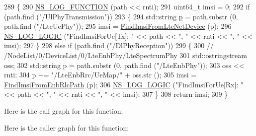 \begin{DoxyCode}
289 \{
290   \hyperlink{log-macros-disabled_8h_a90b90d5bad1f39cb1b64923ea94c0761}{NS\_LOG\_FUNCTION} (path << rnti);
291   uint64\_t imsi = 0;
292   \textcolor{keywordflow}{if} (path.find (\textcolor{stringliteral}{"/UlPhyTransmission"}))
293     \{
294       std::string \hyperlink{lte__link__budget_8m_ac9de518908a968428863f829398a4e62}{p} = path.substr (0, path.find (\textcolor{stringliteral}{"/LteUePhy"}));
295       imsi = \hyperlink{classns3_1_1LteStatsCalculator_a85843b5cea26f922818c1e3374a08e18}{FindImsiFromLteNetDevice} (p);
296       \hyperlink{group__logging_ga88acd260151caf2db9c0fc84997f45ce}{NS\_LOG\_LOGIC} (\textcolor{stringliteral}{"FindImsiForUe[Tx]: "} << path << \textcolor{stringliteral}{", "} << rnti << \textcolor{stringliteral}{", "} << imsi);
297     \}
298   \textcolor{keywordflow}{else} \textcolor{keywordflow}{if} (path.find (\textcolor{stringliteral}{"/DlPhyReception"}))
299     \{
300       \textcolor{comment}{// /NodeList/0/DeviceList/0/LteEnbPhy/LteSpectrumPhy}
301       std::ostringstream oss;
302       std::string p = path.substr (0, path.find (\textcolor{stringliteral}{"/LteEnbPhy"}));
303       oss << rnti;
304       p += \textcolor{stringliteral}{"/LteEnbRrc/UeMap/"} + oss.str ();
305       imsi = \hyperlink{classns3_1_1LteStatsCalculator_a1ed21b0ddc825f8d61a790083d098a76}{FindImsiFromEnbRlcPath} (p);
306       \hyperlink{group__logging_ga88acd260151caf2db9c0fc84997f45ce}{NS\_LOG\_LOGIC} (\textcolor{stringliteral}{"FindImsiForUe[Rx]: "} << path << \textcolor{stringliteral}{", "} << rnti << \textcolor{stringliteral}{", "} << imsi);
307     \}
308   \textcolor{keywordflow}{return} imsi;
309 \}
\end{DoxyCode}


Here is the call graph for this function\+:




Here is the caller graph for this function\+:


